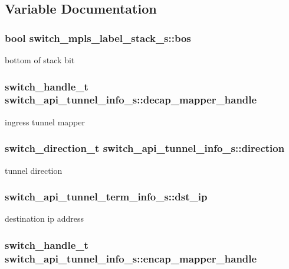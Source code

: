 \subsection{Variable Documentation}
\hypertarget{group__Tunnel_gaefae3f185e3c94cb263058c963043565}{
\subsubsection[{bos}]{\setlength{\rightskip}{0pt plus 5cm}bool switch\+\_\+mpls\+\_\+label\+\_\+stack\+\_\+s\+::bos}}\label{group__Tunnel_gaefae3f185e3c94cb263058c963043565}
bottom of stack bit \hypertarget{group__Tunnel_ga48608d8e6f79b52969707065beab3b29}{
\subsubsection[{decap\+\_\+mapper\+\_\+handle}]{\setlength{\rightskip}{0pt plus 5cm}switch\+\_\+handle\+\_\+t switch\+\_\+api\+\_\+tunnel\+\_\+info\+\_\+s\+::decap\+\_\+mapper\+\_\+handle}}\label{group__Tunnel_ga48608d8e6f79b52969707065beab3b29}
ingress tunnel mapper \hypertarget{group__Tunnel_gacd286841672592eab97054f29f43f797}{
\subsubsection[{direction}]{\setlength{\rightskip}{0pt plus 5cm}switch\+\_\+direction\+\_\+t switch\+\_\+api\+\_\+tunnel\+\_\+info\+\_\+s\+::direction}}\label{group__Tunnel_gacd286841672592eab97054f29f43f797}
tunnel direction \hypertarget{group__Tunnel_ga82dc368b7c3f3663420f3c1b41a04880}{
\subsubsection[{dst\+\_\+ip}]{ switch\+\_\+api\+\_\+tunnel\+\_\+term\+\_\+info\+\_\+s\+::dst\+\_\+ip}}\label{group__Tunnel_ga82dc368b7c3f3663420f3c1b41a04880}
destination ip address \hypertarget{group__Tunnel_gaf221e7b6dc190d612ae79c4a47087637}{
\subsubsection[{encap\+\_\+mapper\+\_\+handle}]{\setlength{\rightskip}{0pt plus 5cm}switch\+\_\+handle\+\_\+t switch\+\_\+api\+\_\+tunnel\+\_\+info\+\_\+s\+::encap\+\_\+mapper\+\_\+handle}}\label{group__Tunnel_gaf221e7b6dc190d612ae79c4a47087637}
